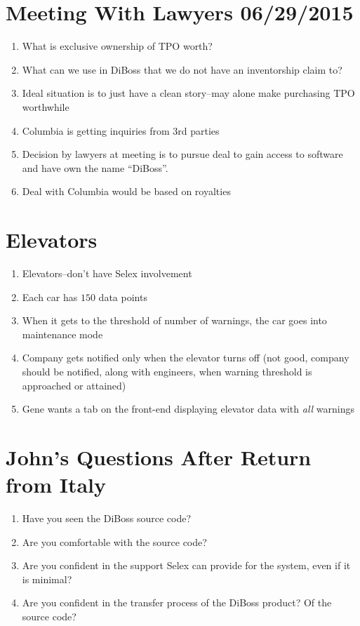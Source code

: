 \documentclass[12pt,a4paper]{article}
\begin{document}
\section{Meeting With Lawyers 06/29/2015}
\begin{enumerate}
	\item What is exclusive ownership of TPO worth?
	\item What can we use in DiBoss that we do not have an inventorship claim
		to?
	\item Ideal situation is to just have a clean story--may alone make
		purchasing TPO worthwhile
	\item Columbia is getting inquiries from $3$rd parties
	\item Decision by lawyers at meeting is to pursue deal to gain access to
		software and have own the name ``DiBoss''.
	\item Deal with Columbia would be based on royalties
\end{enumerate}
\section{Elevators}
\begin{enumerate}
	\item Elevators--don't have Selex involvement
	\item Each car has $150$ data points
	\item When it gets to the threshold of number of warnings, the car goes
		into maintenance mode
	\item Company gets notified only when the elevator turns off (not good,
		company should be notified, along with engineers, when warning threshold is
		approached or attained)
	\item Gene wants a tab on the front-end displaying elevator data with
		\emph{all} warnings
\end{enumerate}
\section{John's Questions After Return from Italy}
\begin{enumerate}
	\item Have you seen the DiBoss source code?
	\item Are you comfortable with the source code?
	\item Are you confident in the support Selex can provide
		for the system, even if it is minimal?
	\item Are you confident in the transfer process of the DiBoss product?
		Of the source code?
\end{enumerate}
\end{document}
